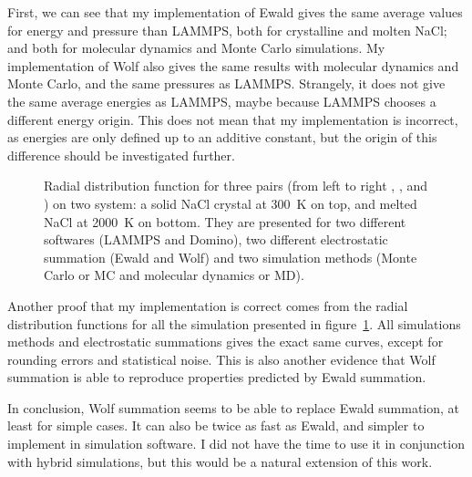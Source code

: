 \documentclass[thesis]{subfiles}
\begin{document}
First, we can see that my implementation of Ewald gives the same average values
for energy and pressure than LAMMPS, both for crystalline and molten NaCl; and
both for molecular dynamics and Monte Carlo simulations. My implementation of
Wolf also gives the same results with molecular dynamics and Monte Carlo, and
the same pressures as LAMMPS. Strangely, it does not give the same average
energies as LAMMPS, maybe because LAMMPS chooses a different energy origin.
This does not mean that my implementation is incorrect, as energies are only
defined up to an additive constant, but the origin of this difference should be
investigated further.

\begin{figure}[t]
    \centering
    
    \caption{Radial distribution function for three pairs (from left to right
    , , and ) on two system: a solid NaCl crystal
    at \SI{300}{K} on top, and melted NaCl at \SI{2000}{K} on bottom. They are
    presented for two different softwares (LAMMPS and Domino), two different
    electrostatic summation (Ewald and Wolf) and two simulation methods (Monte
    Carlo or MC and molecular dynamics or MD).}
    \label{fig:ewald-vs-wolf:rdf}
\end{figure}

Another proof that my implementation is correct comes from the radial
distribution functions for all the simulation presented in
figure~\ref{fig:ewald-vs-wolf:rdf}. All simulations methods and electrostatic
summations gives the exact same curves, except for rounding errors and
statistical noise. This is also another evidence that Wolf summation is able to
reproduce properties predicted by Ewald summation.

In conclusion, Wolf summation seems to be able to replace Ewald summation, at
least for simple cases. It can also be twice as fast as Ewald, and simpler to
implement in simulation software. I did not have the time to use it in
conjunction with hybrid simulations, but this would be a natural extension of
this work.

\OnlyInSubfile{\printglobalbibliography}
\end{document}
